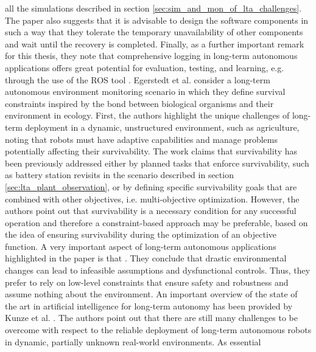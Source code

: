 \documentclass[english, master, utf8]{base/thesis_KBS}
\newcommand{\code}{\collectverb{\codebox}}
\begin{document}
all the simulations described in section \ref{sec:sim_and_mon_of_lta_challenges}. The paper also suggests that it is advisable to design the software components in such a way that
they tolerate the temporary unavailability of other components and wait until the recovery is completed. Finally, as a further important remark for this thesis, they note that
comprehensive logging in long-term autonomous applications offers great potential for evaluation, testing, and learning, e.g. through the use of the ROS tool \code{rosbag}.\newline
Egerstedt et al. \cite{Egerstedt:2018} consider a long-term autonomous environment monitoring scenario in which they define survival constraints inspired by the bond between
biological organisms and their environment in ecology. First, the authors highlight the unique challenges of long-term deployment in a dynamic, unstructured environment, such as
agriculture, noting that robots must have adaptive capabilities and manage problems potentially affecting their survivability.  \cite{Egerstedt:2018} The work claims that survivability has been
previously addressed either by planned tasks that enforce survivability, such as battery station revisits in the scenario described in section \ref{sec:lta_plant_observation},
or by defining specific survivability goals that are combined with other objectives, i.e. multi-objective optimization. However, the authors point out that survivability is a
necessary condition for any successful operation and therefore a constraint-based approach may be preferable, based on the idea of ensuring survivability during the optimization
of an objective function. A very important aspect of long-term autonomous applications highlighted in the paper is that . \cite{Egerstedt:2018} They conclude that drastic environmental changes can lead to infeasible assumptions and
dysfunctional controls. Thus, they prefer to rely on low-level constraints that ensure safety and robustness and assume nothing about the environment.\newline
An important overview of the state of the art in artificial intelligence for long-term autonomy has been provided by Kunze et al. \cite{Kunze:2018}. The authors point out that there
are still many challenges to be overcome with respect to the reliable deployment of long-term autonomous robots in dynamic, partially unknown real-world environments. As essential
\end{document}
